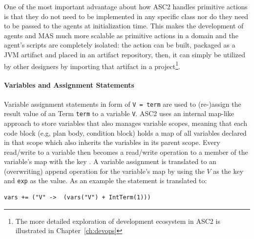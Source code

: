 One of the most important advantage about how ASC2 handles primitive actions is that they do not need to be implemented in any specific class nor do they need to be passed to the agents at initialization time. This makes the development of agents and MAS much more scalable as primitive actions in a domain and the agent's scripts are completely isolated: the  action can be built, packaged as a JVM artifact and placed in an artifact repository, then, it can simply be utilized by other designers by importing that artifact in a project\footnote{The more detailed exploration of development ecosystem in ASC2 is illustrated in Chapter~\ref{ch:devops}}.


\paragraph{Variables and Assignment Statements}
Variable assignment statements in form of \verb+V = term+ are used to (re-)assign the result value of an Term \verb+term+ to a variable \verb+V+. ASC2 uses an internal map-like approach to store variables that also manages variable scopes, meaning that each code block (e.g, plan body, condition block) holds a map of all variables declared in that scope which also inherits the variables in its parent scope. Every read/write to a variable  then becomes a read/write operation to a member of the variable's map with the key . A variable assignment is translated to an (overwriting) append operation for the variable's map by using the $V$ as the key and \verb+exp+ as the value. As an example the statement  is translated to:

\begin{verbatim}
vars += ("V" ->  (vars("V") + IntTerm(1)))
\end{verbatim}
